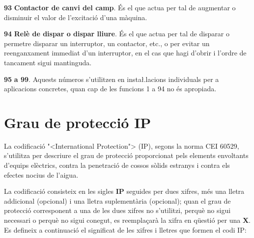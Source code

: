 \begin{multicols}{2}
\begin{list}{}
\item[\textbf{93}]   
\textbf{Contactor de canvi del camp}. \'{E}s el
que actua per tal de augmentar o disminuir el valor de l'excitaci\'{o}
d'una m\`{a}quina.

\item[\textbf{94}]   
\textbf{Rel\`{e} de dispar o dispar
lliure}. \'{E}s el que actua per tal de disparar o permetre disparar un
interruptor, un contactor, etc., o per evitar un reenganxament
immediat d'un interruptor, en el cas que hagi d'obrir i l'ordre de
tancament sigui mantinguda.

\item[\textbf{95}] \textbf{a 99}. Aquests n\'{u}meros s'utilitzen en insta{\l.l}acions
individuals per a aplicacions concretes, quan cap de les funcions 1
a 94 no \'{e}s apropiada.

\end{list}
\end{multicols}


\section{Grau de protecci\'{o} IP}   

La codificaci\'{o} {"<}International Protection{">} (\textsf{IP}), segons la
norma \textsf{CEI 60529}, s'utilitza per descriure el grau de
protecci\'{o}  proporcionat pels elements envoltants d'equips el\`{e}ctrics, contra
la penetraci\'{o} de cossos s\`{o}lids estranys i contra els efectes nocius
de l'aigua.

La codificaci\'{o} consisteix en les sigles \textsf{\textbf{IP}}
seguides per dues xifres, m\'{e}s una lletra addicional (opcional) i una
lletra suplement\`{a}ria (opcional); quan el grau de protecci\'{o}
corresponent a una de les dues xifres no s'utilitzi, perqu\`{e} no sigui
necessari o perqu\`{e} no sigui conegut, es reempla\c{c}ar\`{a} la xifra en
q\"{u}esti\'{o} per una \textsf{\textbf{X}}. Es defineix a continuaci\'{o} el
significat de les xifres i lletres que formen el codi \textsf{IP}:

